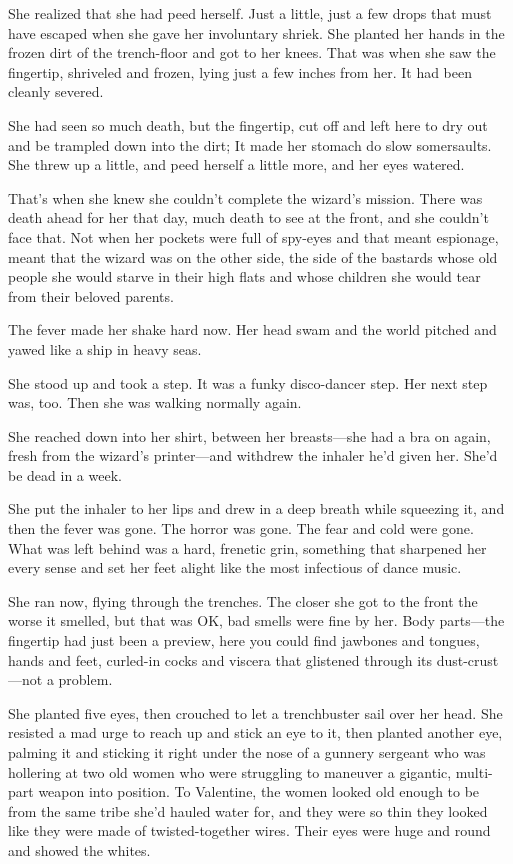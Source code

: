 She realized that she had peed herself. Just a little, just a few
drops that must have escaped when she gave her involuntary shriek.
She planted her hands in the frozen dirt of the trench-floor and
got to her knees. That was when she saw the fingertip, shriveled
and frozen, lying just a few inches from her. It had been cleanly
severed.

She had seen so much death, but the fingertip, cut off and left
here to dry out and be trampled down into the dirt; It made her
stomach do slow somersaults. She threw up a little, and peed
herself a little more, and her eyes watered.

That’s when she knew she couldn’t complete the wizard’s mission.
There was death ahead for her that day, much death to see at the
front, and she couldn’t face that. Not when her pockets were full
of spy-eyes and that meant espionage, meant that the wizard was on
the other side, the side of the bastards whose old people she would
starve in their high flats and whose children she would tear from
their beloved parents.

The fever made her shake hard now. Her head swam and the world
pitched and yawed like a ship in heavy seas.

She stood up and took a step. It was a funky disco-dancer step. Her
next step was, too. Then she was walking normally again.

She reached down into her shirt, between her breasts—she had a bra
on again, fresh from the wizard’s printer—and withdrew the inhaler
he’d given her. She’d be dead in a week.

She put the inhaler to her lips and drew in a deep breath while
squeezing it, and then the fever was gone. The horror was gone. The
fear and cold were gone. What was left behind was a hard, frenetic
grin, something that sharpened her every sense and set her feet
alight like the most infectious of dance music.

She ran now, flying through the trenches. The closer she got to the
front the worse it smelled, but that was OK, bad smells were fine
by her. Body parts—the fingertip had just been a preview, here you
could find jawbones and tongues, hands and feet, curled-in cocks
and viscera that glistened through its dust-crust—not a problem.

She planted five eyes, then crouched to let a trenchbuster sail
over her head. She resisted a mad urge to reach up and stick an eye
to it, then planted another eye, palming it and sticking it right
under the nose of a gunnery sergeant who was hollering at two old
women who were struggling to maneuver a gigantic, multi-part weapon
into position. To Valentine, the women looked old enough to be from
the same tribe she’d hauled water for, and they were so thin they
looked like they were made of twisted-together wires. Their eyes
were huge and round and showed the whites.

